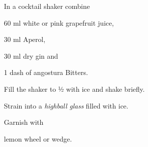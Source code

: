 \startsection[title={Pretty in Pink},reference=prettyinpink]
\startitemize
\item In a cocktail shaker combine
      \startitemize
      \item 60 ml white or pink grapefruit juice,
      \item 30 ml Aperol,
      \item 30 ml dry gin and
      \item 1 dash of angostura Bitters.
      \stopitemize
\item Fill the shaker to ½ with ice and shake briefly.
\item Strain into a {\em highball glass} filled with ice.
\item Garnish with
      \startitemize
      \item lemon wheel or wedge.
      \stopitemize
\stopitemize
